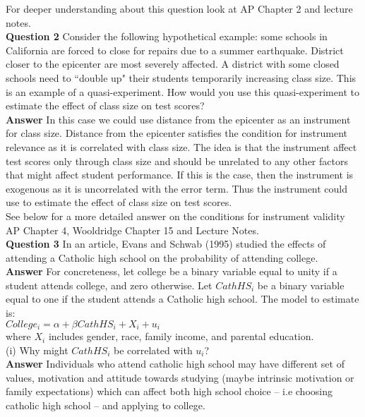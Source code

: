 \documentclass[12pt, oneside]{article}   	%
\begin{document}
For deeper understanding about this question look at AP Chapter 2 and lecture notes. \\

\indent \textbf{Question 2 } Consider the following hypothetical example: some schools in California are forced to close for repairs due to a summer earthquake. District closer to the epicenter are most severely affected. A district with some closed schools need to ``double up" their students temporarily increasing class size. This is an example of a quasi-experiment. How would you use this quasi-experiment to estimate the effect of class size on test scores?\\

\textbf{Answer}  In this case we could use distance from the  epicenter as an instrument for class size. Distance from the epicenter satisfies the condition for instrument relevance as it is correlated with class size. The idea is that the instrument affect test scores only through class size and should be unrelated to any other factors that might affect student performance. If this is the case, then the instrument is exogenous as it is uncorrelated with the error term. Thus the instrument could use to estimate the effect of class size on test scores. 
\\See below for a more detailed answer on the conditions for instrument validity  AP Chapter 4, Wooldridge Chapter 15 and Lecture Notes. \\
 
 
\indent  \textbf{Question 3 } 
\indent In an article, Evans and Schwab (1995) studied the effects of attending a
Catholic high school on the probability of attending college.\\

\textbf{Answer} For concreteness, let college
be a binary variable equal to unity if a student attends college, and zero otherwise.
Let $CathHS_i$ be a binary variable equal to one if the student attends a Catholic high
school. The model to estimate is:\\
 
$College_i=\alpha+\beta CathHS_i+X_i+u_i$ \\
 
where $X_i$  includes gender, race, family income, and parental education.\\

(i) Why might $CathHS_i$ be correlated with $u_i$?\\

\textbf{Answer} Individuals who attend catholic high school may have different set of values, motivation and attitude towards studying (maybe intrinsic motivation or family expectations) which can affect both high school choice -- i.e choosing catholic high school -- and applying to college. \\   
\end{document}
